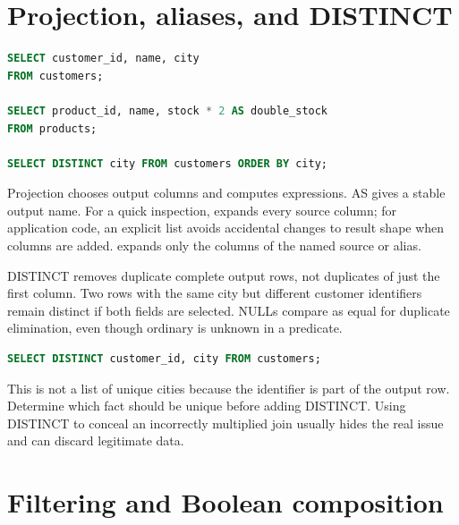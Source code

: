 
\section{Projection, aliases, and DISTINCT}

\begin{lstlisting}[language=SQL]
SELECT customer_id, name, city
FROM customers;

SELECT product_id, name, stock * 2 AS double_stock
FROM products;

SELECT DISTINCT city FROM customers ORDER BY city;
\end{lstlisting}

Projection chooses output columns and computes expressions. AS gives a stable output name. For a quick inspection,  expands every source column; for application code, an explicit list avoids accidental changes to result shape when columns are added.  expands only the columns of the named source or alias.

DISTINCT removes duplicate complete output rows, not duplicates of just the first column. Two rows with the same city but different customer identifiers remain distinct if both fields are selected. NULLs compare as equal for duplicate elimination, even though ordinary  is unknown in a predicate.

\begin{lstlisting}[language=SQL]
SELECT DISTINCT customer_id, city FROM customers;
\end{lstlisting}

This is not a list of unique cities because the identifier is part of the output row. Determine which fact should be unique before adding DISTINCT. Using DISTINCT to conceal an incorrectly multiplied join usually hides the real issue and can discard legitimate data.


\section{Filtering and Boolean composition}

